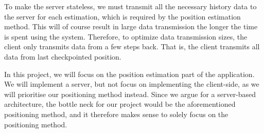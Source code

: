 To make the server stateless, we must transmit all the necessary history data to the server for each estimation, which is required by the position estimation method. This will of course result in large data transmission the longer the time is spent using the system. Therefore, to optimize data transmission sizes, the client only transmits data from a few steps back. That is, the client transmits all data from last checkpointed position.

In this project, we will focus on the position estimation part of the application. We will implement a server, but not focus on implementing the client-side, as we will prioritise our positioning method instead. Since we argue for a server-based architecture, the bottle neck for our project would be the aforementioned positioning method, and it therefore makes sense to solely focus on the positioning method.